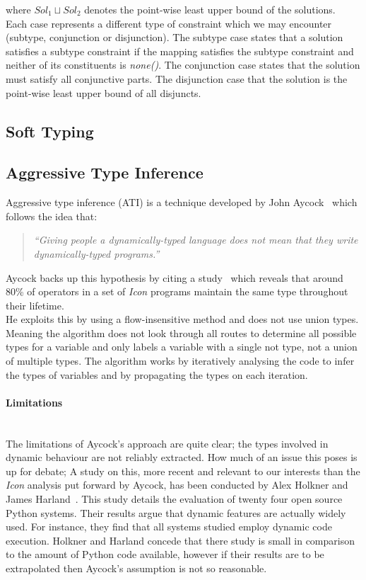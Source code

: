 \documentclass[12pt, titlepage]{article}
\begin{document}
where $Sol_1 \sqcup Sol_2$ denotes the point-wise least upper bound of the solutions. \\
Each case represents a different type of constraint which we may encounter (subtype, conjunction or disjunction). The subtype case states that a solution satisfies a subtype constraint if the mapping satisfies the subtype constraint and neither of its constituents is \textit{none()}. The conjunction case states that the solution must satisfy all conjunctive parts. The disjunction case that the solution is the point-wise least upper bound of all disjuncts.

\subsection{Soft Typing}

\subsection{Aggressive Type Inference}
Aggressive type inference (ATI) is a technique developed by John Aycock~\cite{aggressiveType} which follows the idea that:
\begin{quote}
	\emph{``Giving people a dynamically-typed language does not mean that they write dynamically-typed programs.''}
\end{quote}
Aycock backs up this hypothesis by citing a study~\cite{typeInferenceIcon} which reveals that around 80\% of operators in a set of \textit{Icon} programs maintain the same type throughout their lifetime. \\
He exploits this by using a flow-insensitive method and does not use union types. Meaning the algorithm does not look through all routes to determine all possible types for a variable and only labels a variable with a single not type, not a union of multiple types. The algorithm works by iteratively analysing the code to infer the types of variables and by propagating the types on each iteration.
\paragraph{Limitations}\mbox{}\\
The limitations of Aycock's approach are quite clear; the types involved in dynamic behaviour are not reliably extracted. How much of an issue this poses is up for debate;
A study on this, more recent and relevant to our interests than the \textit{Icon} analysis put forward by Aycock, has been conducted by Alex Holkner and James Harland~\cite{evaluatingDynamicBehaviour}. This study details the evaluation of twenty four open source Python systems. Their results argue that dynamic features are actually widely used. For instance, they find that all systems studied employ dynamic code execution. Holkner and Harland concede that there study is small in comparison to the amount of Python code available, however if their results are to be extrapolated then Aycock's assumption is not so reasonable.
\end{document}
